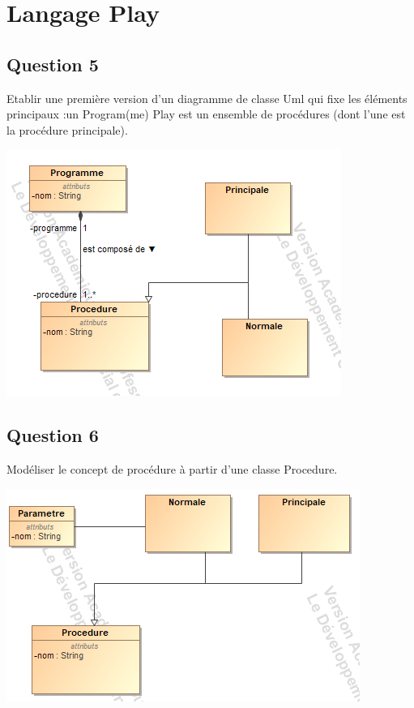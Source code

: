 \documentclass[11pt]{article}
\begin{document}
\section{Langage Play}

\subsection{Question 5}

Etablir une première version d'un diagramme de classe Uml qui fixe les éléments principaux :un Program(me) Play est un ensemble de procédures (dont l'une est la procédure principale).

 \includegraphics[scale=0.5]{Play_Q1.png}

\subsection{Question 6}

Modéliser le concept de procédure à partir d'une classe Procedure.

 \includegraphics[scale=0.5]{Play_Procedure.png}
\end{document}
